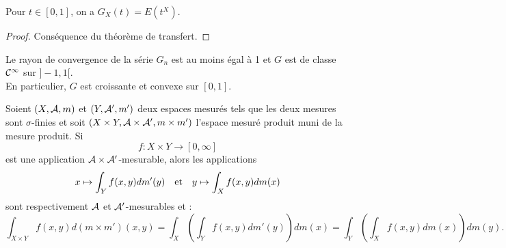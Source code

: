\begin{lem}
Pour $t \in [0,1]$, on a $G_X(t) = E(t^X)$.
\end{lem}

\begin{proof}
Conséquence du théorème de transfert.
\end{proof}

\begin{lem}
Le rayon de convergence de la série $G_n$ est au moins égal à 1 et $G$ est de classe $\mathcal{C}^{\infty}$ sur $]-1,1[$. \\
En particulier, $G$ est croissante et convexe sur $[0,1]$.
\end{lem}

\begin{thm}
Soient $(X, \mathcal{A}, m)$ et $(Y, \mathcal{A}', m')$ deux espaces mesurés tels que les deux mesures sont $\sigma$-finies et soit 
$(X \times Y, \mathcal{A} \times \mathcal{A}', m \times m')$ l'espace mesuré produit muni de la mesure produit. Si
\[ f : X \times Y \to [0, \infty] \]
est une application $\mathcal{A} \times \mathcal{A}'$-mesurable, alors les applications 
\[ x \mapsto \int_Y f(x,y) dm'(y) \quad \text{et} \quad y \mapsto \int_X f(x,y) dm(x) \]
sont respectivement $\mathcal{A}$ et $\mathcal{A}'$-mesurables et :
\[ \int_{X \times Y} f(x,y) d(m\times m')(x, y) = \int_X \left ( \int_Y f(x,y) dm'(y) \right) dm(x) 
= \int_Y \left( \int_X f(x,y) dm(x) \right ) dm(y) . \]
\end{thm}










